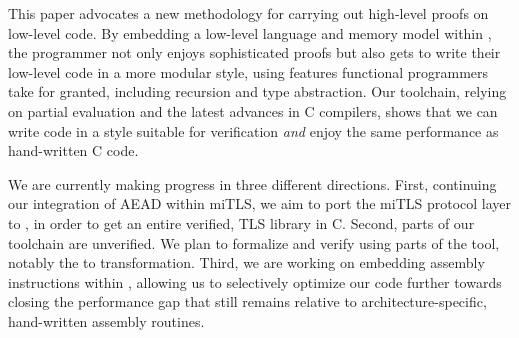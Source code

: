 This paper advocates a new methodology for carrying out high-level
proofs on low-level code. By embedding a low-level language and memory
model within \fstar, the programmer not only enjoys sophisticated
proofs but also gets to write their low-level code in a more modular
style, using features functional programmers take for granted,
including recursion and type abstraction. Our toolchain, relying on
partial evaluation and the latest advances in C compilers, shows that
we can write code in a style suitable for verification \emph{and}
enjoy the same performance as hand-written C code.

We are currently making progress in three different directions. First,
continuing our integration of AEAD within miTLS, we aim to port the
miTLS protocol layer to \lowstar, in order to get an entire verified,
TLS library in C. Second, parts of our toolchain are unverified. We
plan to formalize and verify using \fstar parts of the \kremlin tool,
notably the \lamstar to \cstar transformation. Third, we are working
on embedding assembly instructions within \lowstar, allowing us to
selectively optimize our code further towards closing the performance
gap that still remains relative to architecture-specific, hand-written
assembly routines.




